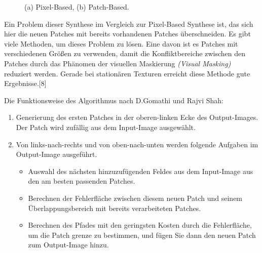 \documentclass[12pt]{report}
\begin{document}
\begin{figure}[H]
    \centering
    \qquad
    \caption{(a) Pixel-Based, (b) Patch-Based.}%
\end{figure}

Ein Problem dieser Synthese im Vergleich zur Pixel-Based Synthese ist, das sich hier die neuen Patches mit bereits vorhandenen Patches überschneiden.
Es gibt viele Methoden, um dieses Problem zu lösen.
Eine davon ist es Patches mit verschiedenen Größen zu verwenden, damit die Konfliktbereiche zwischen den Patches durch das Phänomen der visuellen Maskierung
\textit{(Visual Masking)} reduziert werden.
Gerade bei stationären Texturen erreicht diese Methode gute Ergebnisse.{[8]}

Die Funktionsweise des Algorithmus nach D.Gomathi und Rajvi Shah:

\begin{enumerate}
    \item Generierung des ersten Patches in der oberen-linken Ecke des Output-Images. Der Patch wird zufällig aus dem Input-Image ausgewählt.
    \item Von links-nach-rechts und von oben-nach-unten werden folgende Aufgaben im Output-Image ausgeführt.
    \begin{itemize}
        \item Auswahl des nächsten hinzuzufügenden Feldes aus dem Input-Image aus den am besten passenden Patches.
        \item Berechnen der Fehlerfläche zwischen diesem neuen Patch und seinem Überlappungsbereich mit bereits
        verarbeiteten Patches.
        \item Berechnen des Pfades mit den geringsten Kosten durch die Fehlerfläche, um die Patch grenze zu bestimmen, und fügen Sie dann den neuen Patch zum Output-Image hinzu.
    \end{itemize}
\end{enumerate}
\end{document}
